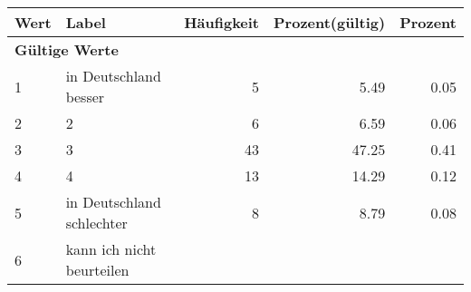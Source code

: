      \begin{longtable}{lXrrr}
     \toprule
     \textbf{Wert} & \textbf{Label} & \textbf{Häufigkeit} & \textbf{Prozent(gültig)} & \textbf{Prozent} \\
     \endhead
     \midrule
     \multicolumn{5}{l}{\textbf{Gültige Werte}}\\

     1 &
     \multicolumn{1}{X}{ in Deutschland besser   } &


       \num{5} &
       \num[round-mode=places,round-precision=2]{5,49} &
         \num[round-mode=places,round-precision=2]{0,05} \\

     2 &
     \multicolumn{1}{X}{ 2   } &


       \num{6} &
       \num[round-mode=places,round-precision=2]{6,59} &
         \num[round-mode=places,round-precision=2]{0,06} \\

     3 &
     \multicolumn{1}{X}{ 3   } &


       \num{43} &
       \num[round-mode=places,round-precision=2]{47,25} &
         \num[round-mode=places,round-precision=2]{0,41} \\

     4 &
     \multicolumn{1}{X}{ 4   } &


       \num{13} &
       \num[round-mode=places,round-precision=2]{14,29} &
         \num[round-mode=places,round-precision=2]{0,12} \\

     5 &
     \multicolumn{1}{X}{ in Deutschland schlechter   } &


       \num{8} &
       \num[round-mode=places,round-precision=2]{8,79} &
         \num[round-mode=places,round-precision=2]{0,08} \\

     6 &
     \multicolumn{1}{X}{ kann ich nicht beurteilen   } &



\end{longtable}
